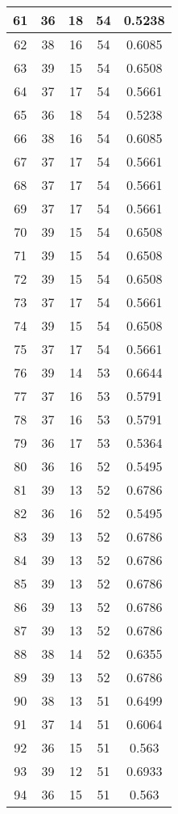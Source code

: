 \documentclass[letterpaper, 12pt]{article}
\begin{document}
\begin{longtable}{|c|c|c|c|c|}
\hline
61 & 36 & 18 & 54 & 0.5238 \\
\hline
62 & 38 & 16 & 54 & 0.6085 \\
\hline
63 & 39 & 15 & 54 & 0.6508 \\
\hline
64 & 37 & 17 & 54 & 0.5661 \\
\hline
65 & 36 & 18 & 54 & 0.5238 \\
\hline
66 & 38 & 16 & 54 & 0.6085 \\
\hline
67 & 37 & 17 & 54 & 0.5661 \\
\hline
68 & 37 & 17 & 54 & 0.5661 \\
\hline
69 & 37 & 17 & 54 & 0.5661 \\
\hline
70 & 39 & 15 & 54 & 0.6508 \\
\hline
71 & 39 & 15 & 54 & 0.6508 \\
\hline
72 & 39 & 15 & 54 & 0.6508 \\
\hline
73 & 37 & 17 & 54 & 0.5661 \\
\hline
74 & 39 & 15 & 54 & 0.6508 \\
\hline
75 & 37 & 17 & 54 & 0.5661 \\
\hline
76 & 39 & 14 & 53 & 0.6644 \\
\hline
77 & 37 & 16 & 53 & 0.5791 \\
\hline
78 & 37 & 16 & 53 & 0.5791 \\
\hline
79 & 36 & 17 & 53 & 0.5364 \\
\hline
80 & 36 & 16 & 52 & 0.5495 \\
\hline
81 & 39 & 13 & 52 & 0.6786 \\
\hline
82 & 36 & 16 & 52 & 0.5495 \\
\hline
83 & 39 & 13 & 52 & 0.6786 \\
\hline
84 & 39 & 13 & 52 & 0.6786 \\
\hline
85 & 39 & 13 & 52 & 0.6786 \\
\hline
86 & 39 & 13 & 52 & 0.6786 \\
\hline
87 & 39 & 13 & 52 & 0.6786 \\
\hline
88 & 38 & 14 & 52 & 0.6355 \\
\hline
89 & 39 & 13 & 52 & 0.6786 \\
\hline
90 & 38 & 13 & 51 & 0.6499 \\
\hline
91 & 37 & 14 & 51 & 0.6064 \\
\hline
92 & 36 & 15 & 51 & 0.563 \\
\hline
93 & 39 & 12 & 51 & 0.6933 \\
\hline
94 & 36 & 15 & 51 & 0.563 \\

\end{longtable}
\end{document}
